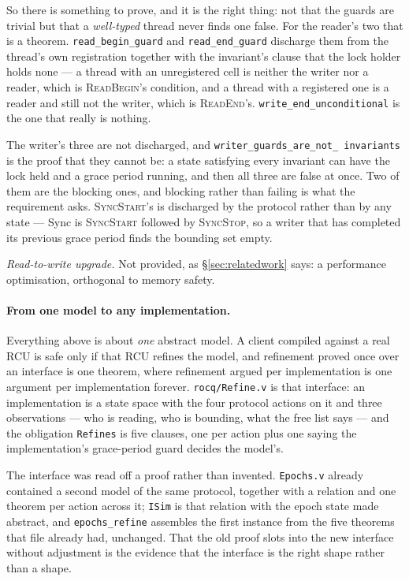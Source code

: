 So there is something to prove, and it is the right thing: not that the guards
are trivial but that a \emph{well-typed} thread never finds one false.  For the
reader's two that is a theorem.  \texttt{read\_begin\_guard} and
\texttt{read\_end\_guard} discharge them from the thread's own registration
together with the invariant's clause that the lock holder holds none --- a
thread with an unregistered cell is neither the writer nor a reader, which is
\textsc{ReadBegin}'s condition, and a thread with a registered one is a reader
and still not the writer, which is \textsc{ReadEnd}'s.
\texttt{write\_end\_unconditional} is the one that really is nothing.

The writer's three are not discharged, and \texttt{writer\_guards\_are\_not\_%
invariants} is the proof that they cannot be: a state satisfying every invariant
can have the lock held and a grace period running, and then all three are false
at once.  Two of them are the blocking ones, and blocking rather than failing is
what the requirement asks.  \textsc{SyncStart}'s is discharged by the protocol
rather than by any state --- \textsf{Sync} is \textsc{SyncStart} followed by
\textsc{SyncStop}, so a writer that has completed its previous grace period
finds the bounding set empty.

\emph{Read-to-write upgrade.}  Not provided, as \S\ref{sec:relatedwork} says: a
performance optimisation, orthogonal to memory safety.

\paragraph{From one model to any implementation.}
Everything above is about \emph{one} abstract model.  A client compiled against
a real RCU is safe only if that RCU refines the model, and refinement proved
once over an interface is one theorem, where refinement argued per
implementation is one argument per implementation forever.
\texttt{rocq/Refine.v} is that interface: an implementation is a state space
with the four protocol actions on it and three observations --- who is reading,
who is bounding, what the free list says --- and the obligation
\texttt{Refines} is five clauses, one per action plus one saying the
implementation's grace-period guard decides the model's.

The interface was read off a proof rather than invented.  \texttt{Epochs.v}
already contained a second model of the same protocol, together with a relation
and one theorem per action across it; \texttt{ISim} is that relation with the
epoch state made abstract, and \texttt{epochs\_refine} assembles the first
instance from the five theorems that file already had, unchanged.  That the old
proof slots into the new interface without adjustment is the evidence that the
interface is the right shape rather than a shape.

